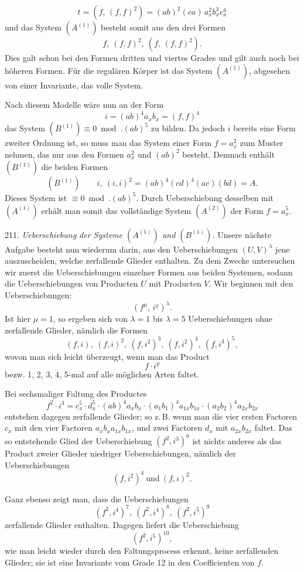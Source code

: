 \documentclass[11pt]{article}
\providecommand{\weberpage}[1]{}
\begin{document}
\weberpage{237}
\[
t = (f,\, (f,f)^2) = (ab)^2(ca)\, a_x^2 b_x^3 c_x^4
\]
und das System $(A^{(1)})$ besteht somit aus den drei Formen
\[
f,\ (f,f)^2,\ (f,\,(f,f)^2).
\]
Dies galt schon bei den Formen dritten und viertes Grades und %
gilt auch noch bei h\"oheren Formen. F\"ur die regul\"aren K\"orper ist
das System $(A^{(1)})$, abgesehen von einer Invariante, das volle System.

Nach diesem Modelle w\"are nun an der Form
\[
i = (ab)^4 a_x b_x = (f,f)^4
\]
das System $(B^{(1)}) \equiv 0 \bmod. (ab)^5$ zu bilden. Da jedoch $i$ bereits eine
Form zweiter Ordnung ist, so muss man das System einer Form
$f = a_x^2$ zum Muster nehmen, das nur aus den Formen $a_x^2$ und $(ab)^2$
besteht. Demnach enth\"alt $(B^{(1)})$ die beiden Formen
\[
(B^{(1)}) \qquad i,\ (i,i)^2 = (ab)^4(cd)^4(ac)(bd) = A.
\]
Dieses System ist $\equiv 0 \bmod. (ab)^5$. Durch Ueberschiebung desselben
 mit $(A^{(1)})$ erh\"alt man somit das vollst\"andige System $(A^{(2)})$ der
Form $f = a_x^5$.

211. \textit{Ueberschiebung der Systeme $(A^{(1)})$ und $(B^{(1)})$.} Unsere n\"achste
Aufgabe besteht nun wiederum darin, aus den Ueberschiebungen
$(U,V)^\lambda$ jene auszuscheiden, welche zerfallende Glieder enthalten. Zu
dem Zwecke untersuchen wir zuerst die Ueberschiebungen einzelner
Formen aus beiden Systemen, sodann die Ueberschiebungen von Producten
 $U$ mit Producten $V$. Wir beginnen mit den Ueberschiebungen:
\[
(f^\mu,\, i^\varrho)^\lambda.
\]
Ist hier $\mu = 1$, so ergeben sich von $\lambda = 1$ bis $\lambda = 5$ Ueberschiebungen
 ohne zerfallende Glieder, n\"amlich die Formen
\[
(f,i),\ (f,i)^2,\ (f,i^2)^3,\ (f,i^2)^4,\ (f,i^3)^5,
\]
wovon man sich leicht \"uberzeugt, wenn man das Product
\[
f \cdot i^\varrho
\]
bezw. 1, 2, 3, 4, 5-mal auf alle m\"oglichen Arten faltet.

Bei sechsmaliger Faltung des Productes
\[
f^2 \cdot i^3 = c_x^5 \cdot d_x^5 \cdot (ab)^4 a_x b_x \cdot (a_1 b_1)^4 a_{1x} b_{1x} \cdot (a_2 b_2)^4 a_{2x} b_{2x}
\]
entstehen dagegen zerfallende Glieder; so z.\,B. wenn man die vier ersten
Factoren $c_x$ mit den vier Factoren $a_x b_x a_{1x} b_{1x}$, und zwei Factoren $d_x$
mit $a_{2x} b_{2x}$ faltet. Das so entstehende Glied der Ueberschiebung
$(f^2, i^3)^6$ ist nichts anderes als das Product zweier Glieder niedriger
Ueberschiebungen, n\"amlich der Ueberschiebungen
\[
(f, i^2)^4 \ \text{und}\ (f, i)^2.
\]


\weberpage{238}
Ganz ebenso zeigt man, dass die Ueberschiebungen
\[
(f^2, i^4)^7,\ (f^2, i^4)^8,\ (f^2, i^5)^9
\]
zerfallende Glieder enthalten. Dagegen liefert die Ueberschiebung
\[
(f^2, i^5)^{10},
\]
wie man leicht wieder durch den Faltungsprocess erkennt, keine zerfallenden
 Glieder; sie ist eine Invariante vom Grade 12 in den Coefficienten
 von $f$.
\end{document}
